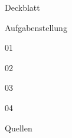 \documentclass[11pt]{scrreprt}
\begin{document}
\setcounter{page}{1}   %

{Deckblatt}

\setcounter{secnumdepth}{3} 
\setcounter{tocdepth}{3}
\tableofcontents %
\pagebreak

{Aufgabenstellung} %




{01}

{02}

{03}

{04}


{Quellen}

% 
\end{document}
